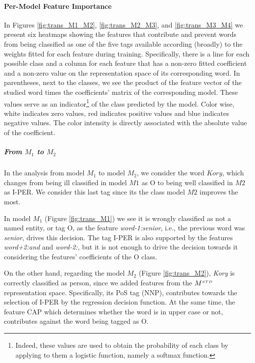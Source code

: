 \paragraph{Per-Model Feature Importance}
In Figures \ref{fig:trans_M1_M2}, \ref{fig:trans_M2_M3}, and \ref{fig:trans_M3_M4} we present six heatmaps showing the features that contribute and prevent words from being classified as one of the five tags available according (broadly) to the weights fitted for each feature during training. Specifically, there is a line for each possible class and a column for each feature that has a non-zero fitted coefficient and a non-zero value on the representation space of its corresponding word. In parentheses, next to the classes, we see the product of  the feature vector of the studied word times the coefficients' matrix of the corresponding model. These values serve as an indicator\footnote{Indeed, these values are used to obtain the  probability of each class by applying to them a logistic function, namely a softmax function.} of the class predicted by the model. Color wise,  white indicates zero values, red indicates positive values and blue indicates negative values. The color intensity is directly associated with the absolute value of the coefficient.

\subparagraph{From $M_1$ to $M_2$} In the analysis from model $M_1$ to model $M_2$, we consider the word $Kory$, which changes from being ill classified in model $M1$ as O to being well classified in $M2$ as I-PER. We consider this last tag since its the class model $M2$ improves the most. 

In model $M_1$ (Figure \ref{fig:trans_M1}) we see it is wrongly classified as not a named entity, or tag O, as the feature \textit{word-1:senior}, i.e., the previous word was \textit{senior}, drives this decision. The tag I-PER is also supported by the features \textit{word+2:and} and \textit{word-2:,} but it is not enough to drive the decision towards it considering the features' coefficients  of the O class.

On the other hand, regarding the model $M_2$ (Figure \ref{fig:trans_M2}), \textit{Kory} is correctly classified  as person, since we added features from the $M^{\scriptscriptstyle STD}$ representation space. Specifically, its PoS tag (NNP), contributes towards the selection of I-PER by the regression decision function. At the same time, the feature CAP which determines whether the word is in upper case or not, contributes against the word being tagged as O.

